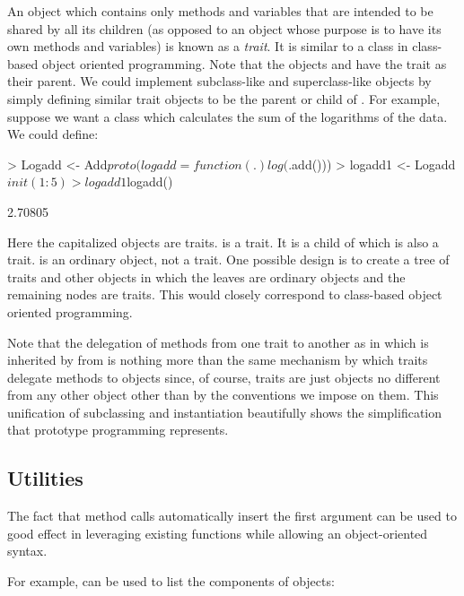 \documentclass{Z}
\begin{document}
An object which contains only methods and variables that are
intended to be shared by all its children (as opposed to an
object whose purpose is to have its own methods and variables)
is known as a \emph{trait}.  It is similar to a class in class-based
object oriented programming.   
Note that the objects  and  have the trait
 as their parent.  We could implement subclass-like and
superclass-like objects by simply defining similar trait objects to 
be the parent or child of .  For example, suppose we
want a class which calculates the sum of the logarithms of the data.  We
could define:

\begin{Schunk}
\begin{Sinput}
> Logadd <- Add$proto(logadd = function(.) log(.$add()))
> logadd1 <- Logadd$init(1:5)
> logadd1$logadd()
\end{Sinput}
\begin{Soutput}
[1] 2.70805
\end{Soutput}
\end{Schunk}

Here the capitalized objects are traits.
 is a trait.  It is a child of 
which is also a trait.   is an ordinary object,
not a trait.
One possible design is to create a tree of traits and other objects
in which the leaves are ordinary objects and the remaining nodes
are traits.  This would closely correspond to class-based
object oriented programming.  

Note that the delegation of methods from
one trait to another as in
 which is inherited by  from 
is nothing more than the same mechanism by which traits delegate
methods to
objects since, of course, traits are just objects no different
from any other object other than by the conventions we impose on them.
This unification of subclassing and instantiation beautifully
shows the simplification that prototype programming represents.

\subsection{Utilities}
\label{sec:utilities}
The fact that method calls automatically insert the first argument
can be used to good effect in leveraging existing 
functions while allowing an object-oriented syntax.

For example,  can be used to list the components of
 objects:
\end{document}
